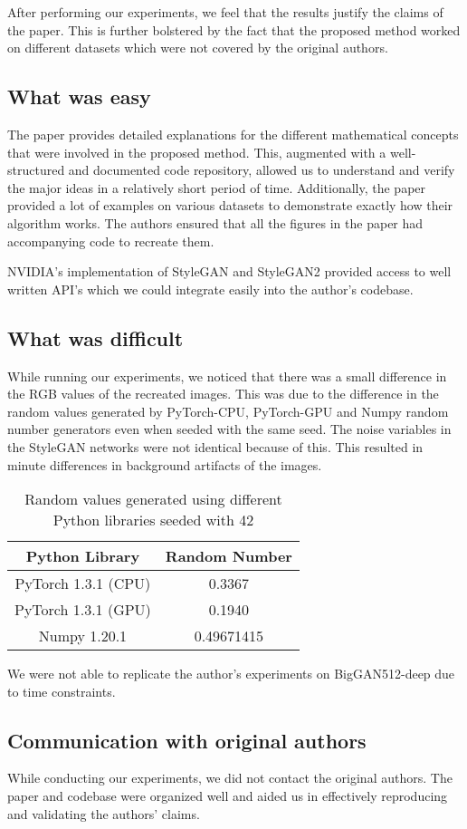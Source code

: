 After performing our experiments, we feel that the results justify the claims of the paper. This is further bolstered by the fact that the proposed method worked on different datasets which were not covered by the original authors.

\subsection{What was easy}

The paper provides detailed explanations for the different mathematical concepts that were involved in the proposed method. This, augmented with a well-structured and documented code repository, allowed us to understand and verify the major ideas in a relatively short period of time. Additionally, the paper provided a lot of examples on various datasets to demonstrate exactly how their algorithm works. The authors ensured that all the figures in the paper had accompanying code to recreate them.

NVIDIA's implementation of StyleGAN and StyleGAN2 provided access to well written API's which we could integrate easily into the author's codebase.

\subsection{What was difficult}

While running our experiments, we noticed that there was a small difference in the RGB values of the recreated images. This was due to the difference in the random values generated by PyTorch-CPU, PyTorch-GPU and Numpy random number generators even when seeded with the same seed. The noise variables in the StyleGAN networks were not identical because of this. This resulted in minute differences in background artifacts of the images.

\begin{table}[H]
\centering
\begin{tabular}{cc}
\hline
Python Library & Random Number \\ \hline
PyTorch 1.3.1 (CPU)     & 0.3367                 \\
PyTorch 1.3.1 (GPU)     & 0.1940                 \\ 
Numpy 1.20.1            & 0.49671415             \\ \hline
\end{tabular}
\caption{Random values generated using different Python libraries seeded with 42}
\end{table}

We were not able to replicate the author's experiments on BigGAN512-deep due to time constraints. 

\subsection{Communication with original authors}

While conducting our experiments, we did not contact the original authors. The paper and codebase were organized well and aided us in effectively reproducing and validating the authors' claims.